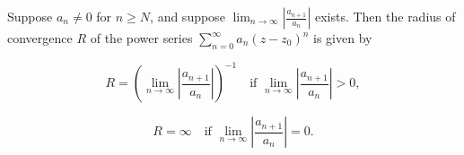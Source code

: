 Suppose $a_n \neq 0$ for $n \geq N$, and suppose $\displaystyle \lim_{n \to \infty} \left| \frac{a_{n+1}}{a_n} \right|$ exists. Then the radius of convergence $R$ of the power series $\sum_{n=0}^{\infty} a_n (z - z_0)^n$ is given by

$$R = \left( \lim_{n \to \infty} \left| \frac{a_{n+1}}{a_n} \right| \right)^{-1} \quad \text{if } \lim_{n \to \infty} \left| \frac{a_{n+1}}{a_n} \right| > 0,$$

$$R = \infty \quad \text{if } \lim_{n \to \infty} \left| \frac{a_{n+1}}{a_n} \right| = 0.$$
